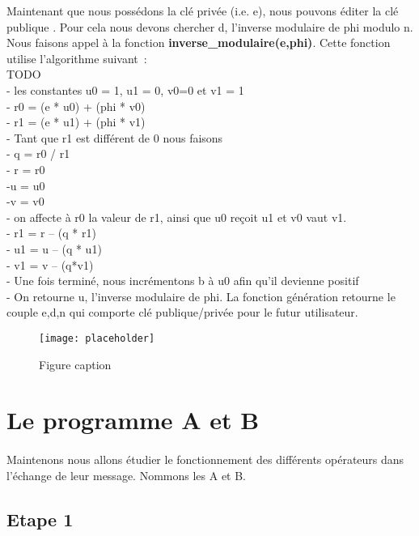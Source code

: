 \documentclass[11pt,fleqn]{book} %
\begin{document}
\vspace{0.5cm}Maintenant que nous possédons la clé privée (i.e. e), nous pouvons éditer la clé publique	. Pour cela 
nous devons chercher d, l'inverse modulaire de phi modulo n. Nous faisons appel à la fonction \textbf{inverse\_modulaire(e,phi)}. Cette fonction utilise l’algorithme suivant :
\\TODO
\\- les constantes u0 = 1, u1 = 0, v0=0 et v1 = 1
\\- r0 = (e * u0) + (phi * v0)
\\- r1 = (e * u1) + (phi * v1)
\\- Tant que r1 est différent de 0 nous faisons
\\	- q = r0 / r1
\\	- r = r0
\\	-u = u0
\\	-v = v0
\\	- on affecte à r0 la valeur de r1, ainsi que u0 reçoit u1 et v0 vaut v1.
\\	- r1 = r – (q * r1)
\\	- u1 = u – (q * u1)
\\	- v1 = v – (q*v1)
\\- Une fois terminé,  nous incrémentons b à u0 afin qu'il devienne positif
\\- On retourne u, l'inverse modulaire de phi.
\vspace{0.5cm}La fonction génération retourne le couple e,d,n qui comporte clé publique/privée pour le futur utilisateur.

\begin{figure}[h]
\centering\texttt{[image: placeholder]}
\caption{Figure caption}
\end{figure}


\section{Le programme A et B}
\paragraph{}Maintenons nous allons étudier le fonctionnement des différents opérateurs dans l'échange de leur message. Nommons les A et B. 
\subsection{Etape 1}
\end{document}
